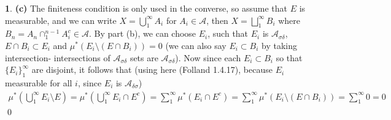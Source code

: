 \documentclass[10.5pt]{article}
\theoremstyle{definition}
\newtheorem{pb}{}
\newcommand{\set}[1]{\{#1\}}
\begin{document}
\begin{pb}
        \textbf{(c)} The finiteness condition is only used in the converse, so assume that \(E\) is measurable, and we can write \(X = \bigcup_1^\infty A_i\) for \(A_i \in \mathcal{A}\), then \(X = \bigsqcup_1^\infty B_i\) where \(B_n = A_n \cap_1^{n-1} A_i^c \in \mathcal{A}\). By part (b), we can choose \(E_i\), such that \(E_i\) is \(\mathcal{A}_{\sigma \delta}\), \(E\cap B_i \subset E_i\) and \(\mu^*(E_i \setminus (E \cap B_i)) = 0\) (we can also say \(E_i \subset B_i\) by taking intersection- intersections of \(\mathcal{A}_{\sigma \delta}\) sets are \(\mathcal{A}_{\sigma \delta}\)). Now since each \(E_i \subset B_i\) so that \(\set{E_i}_1^\infty\) are disjoint, it follows that (using here (Folland 1.4.17), because \(E_i\) measurable for all \(i\), since \(E_i\) is \(\mathcal{A}_{\delta \sigma}\))
        \begin{align*}
            \mu^*(\bigcup_1^\infty E_i \setminus E) = \mu^*(\bigcup_1^\infty E_i \cap E^c) = \sum_1^\infty \mu^*(E_i \cap E^c) = \sum_1^\infty \mu^*(E_i \setminus (E \cap B_i)) = \sum_1^\infty 0 = 0
        \end{align*} \qed
    \end{pb}
\end{document}
